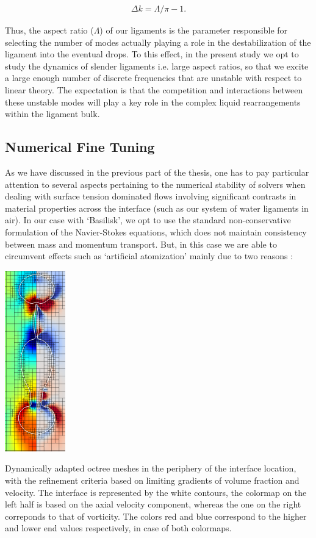 \begin{align}
 \Delta k = \Lambda / \pi - 1 .  
\end{align}

Thus, the aspect ratio ($\Lambda$) of our ligaments is the parameter 
responsible for selecting the number of modes actually playing a 
role in the destabilization of the ligament into the eventual drops. 
To this effect, in the present study we opt to study the dynamics of 
slender ligaments i.e. large aspect ratios, so that we excite a large enough 
number of discrete frequencies that are unstable with respect to linear theory. 
The expectation is that the competition and interactions 
between these unstable modes will play a key role in the
complex liquid rearrangements within the ligament bulk. 

\subsection*{Numerical Fine Tuning}
As we have discussed in the previous part of the thesis,  
one has to pay particular attention to several aspects pertaining to 
the numerical stability of solvers when dealing with surface tension 
dominated flows involving significant contrasts in material properties 
across the interface (such as our system of water ligaments in air). 
In our case with `Basilisk', we opt to use the standard non-conservative
formulation of the Navier-Stokes equations, which does not maintain 
consistency between mass and momentum transport. 
But, in this case we are able to circumvent effects such as `artificial
atomization' mainly due to two reasons :

\begin{marginfigure}
\centering
\includegraphics{plots/ligament_breakup/lig_mesh.pdf}
\caption{ Dynamically adapted octree meshes in the periphery 
of the interface location, with the refinement criteria based on
limiting gradients of volume fraction and velocity. The interface
is represented by the white contours, the colormap on the left half is
based on the axial velocity component, whereas the one on the right 
correponds to that of vorticity. 
The colors red and blue correspond to 
the higher and lower end values respectively, in case of both colormaps. 
	}
\label{lig_mesh}
\end{marginfigure}

